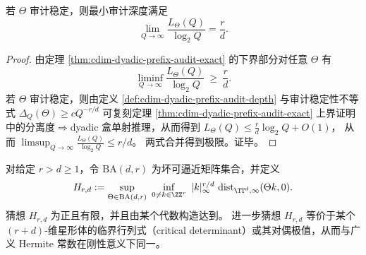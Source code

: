 \begin{corollary}[临界幂律下的深度极限]\label{cor:cdim-audit-stable-depth-limit}
若 \(\Theta\) 审计稳定，则最小审计深度满足
\[
\lim_{Q\to\infty}\frac{L_{\Theta}(Q)}{\log_2 Q}=\frac{r}{d}.
\]
\end{corollary}
\begin{proof}
由定理 \ref{thm:cdim-dyadic-prefix-audit-exact} 的下界部分对任意 \(\Theta\) 有
\[
\liminf_{Q\to\infty}\frac{L_{\Theta}(Q)}{\log_2 Q}\ \ge\ \frac{r}{d}.
\]
若 \(\Theta\) 审计稳定，则由定义 \ref{def:cdim-dyadic-prefix-audit-depth} 与审计稳定性不等式
\(
\Delta_Q(\Theta)\ge cQ^{-r/d}
\)
可复刻定理 \ref{thm:cdim-dyadic-prefix-audit-exact} 上界证明中的分离度\(\Rightarrow\)dyadic 盒单射推理，从而得到
\(
L_{\Theta}(Q)\le \frac{r}{d}\log_2 Q+O(1)
\)，
从而
\(
\limsup_{Q\to\infty}\frac{L_{\Theta}(Q)}{\log_2 Q}\le r/d
\)。
两式合并得到极限。证毕。
\end{proof}

\begin{conjecture}\label{conj:cdim-hurwitz-constant-critical-determinant}
对给定 \(r>d\ge 1\)，令 \(\mathrm{BA}(d,r)\) 为坏可逼近矩阵集合，并定义
\[
H_{r,d}:=\sup_{\Theta\in\mathrm{BA}(d,r)}\ \inf_{0\neq k\in\ZZ^r}\ |k|_\infty^{r/d}\,\operatorname{dist}_{\TT^d,\infty}(\Theta k,0).
\]
猜想 \(H_{r,d}\) 为正且有限，并且由某个代数构造达到。
进一步猜想 \(H_{r,d}\) 等价于某个 \((r{+}d)\)-维星形体的临界行列式（critical determinant）或其对偶极值，从而与广义 Hermite 常数在刚性意义下同一。
\end{conjecture}

\endinput
